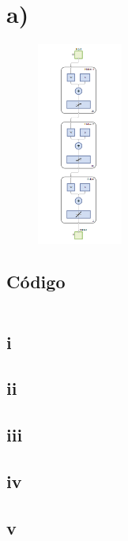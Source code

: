 \documentclass[a4paper, 12pt]{article}
\begin{document}
    \section{a)}
	
	\begin{figure}[htp!]
		\centering
		\includegraphics[width=0.25\textwidth]{figures/red.png}
	\end{figure}
	
	
	\subsection{Código}
	\inputminted[fontsize=\scriptsize, linenos, breaklines=true, xleftmargin=0.75cm, frame=lines]{matlab}{code/parte1/red,png}
    
        \subsection{i}
        
        \subsection{ii}
        
        \subsection{iii}
        
        \subsection{iv}
        
        \subsection{v}
        
\end{document}
